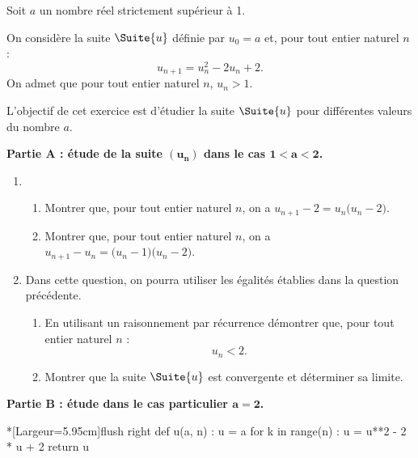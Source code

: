 Soit $a$ un nombre réel strictement supérieur à 1.

\smallskip

On considère la suite $\Suite{u}$ définie par $u_0=a$ et, pour tout entier naturel $n$ : \[ u_{n+1}=u_n^2-2u_n+2. \]
%
On admet que pour tout entier naturel $n$, $u_n > 1$.

\smallskip

L'objectif de cet exercice est d'étudier la suite $\Suite{u}$ pour différentes valeurs du nombre $a$.

\begin{Centrage}
	\textbf{Partie A : étude de la suite $\bm{\left(u_n\right)}$ dans le cas $\bm{1 < a < 2}$.}
\end{Centrage}

\begin{enumerate}
	\item 
	\begin{enumerate}
		\item Montrer que, pour tout entier naturel $n$, on a $u_{n+1}-2 = u_n \big(u_n-2\big)$.
		\item Montrer que, pour tout entier naturel $n$, on a $u_{n+1}-u_n = \big(u_n-1\big)\big(u_n-2\big)$.
	\end{enumerate}
	\item Dans cette question, on pourra utiliser les égalités établies dans la question précédente.
	\begin{enumerate}
		\item En utilisant un raisonnement par récurrence démontrer que, pour tout entier naturel $n$ : \[ u_n < 2. \]
		\item Montrer que la suite $\Suite{u}$ est convergente et déterminer sa limite.
	\end{enumerate}
\end{enumerate}

\begin{Centrage}
	\textbf{Partie B : étude dans le cas particulier $\bm{a = 2}$.}
\end{Centrage}

\begin{wrapstuff}[r]
\begin{minipage}{6cm}
\begin{CodePythonLstAlt}*[Largeur=5.95cm]{flush right}
def u(a, n) :
	u = a
	for k in range(n) :
		u = u**2 - 2 * u + 2
	return u
\end{CodePythonLstAlt}
\end{minipage}
\end{wrapstuff}


